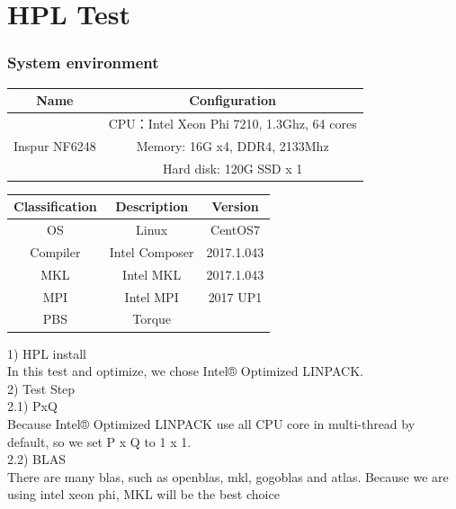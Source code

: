 \documentclass[conference,compsoc]{appendix/report}
\begin{document}

\section{HPL Test}
\subsubsection{System environment}
\begin{tabular}{|c|c|}
\hline
Name & Configuration \\
\hline
\multirow{3}{*}{Inspur NF6248 } & CPU：Intel Xeon Phi 7210, 1.3Ghz, 64 cores \\ 
& Memory: 16G x4, DDR4, 2133Mhz \\
& Hard disk: 120G SSD x 1\\
\hline
\end{tabular}
\newline
\newline

\noindent \begin{tabular}{|c|c|c|}
\hline
Classification & Description & Version \\
\hline
OS & Linux & CentOS7 \\
\hline
Compiler & Intel Composer & 2017.1.043 \\
\hline
MKL & Intel MKL & 2017.1.043 \\
\hline
MPI & Intel MPI & 2017 UP1 \\
\hline
PBS & Torque &\\
\hline
\end{tabular}
\newline
\newline
\newline
1) HPL install \\

In this test and optimize, we chose Intel® Optimized LINPACK. \\

2) Test Step \\

2.1) PxQ \\

Because Intel® Optimized LINPACK use all CPU core in multi-thread
by default, so we set P x Q to 1 x 1. \\

2.2) BLAS \\
There are many blas, such as openblas, mkl, gogoblas and atlas.
Because we are using intel xeon phi, MKL will be the best choice \\
\end{document}
